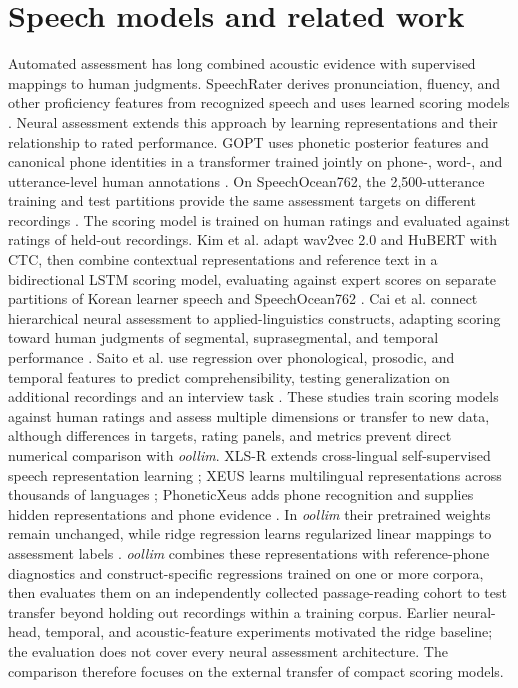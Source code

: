 \documentclass[cameraready]{Interspeech}
\begin{document}
\section{Speech models and related work}
Automated assessment has long combined acoustic evidence with supervised mappings to human judgments. SpeechRater derives pronunciation, fluency, and other proficiency features from recognized speech and uses learned scoring models \cite{speechrater}. Neural assessment extends this approach by learning representations and their relationship to rated performance. GOPT uses phonetic posterior features and canonical phone identities in a transformer trained jointly on phone-, word-, and utterance-level human annotations \cite{gopt}. On SpeechOcean762, the 2,500-utterance training and test partitions provide the same assessment targets on different recordings \cite{speechocean,gopt}. The scoring model is trained on human ratings and evaluated against ratings of held-out recordings. Kim et al. adapt wav2vec 2.0 and HuBERT with CTC, then combine contextual representations and reference text in a bidirectional LSTM scoring model, evaluating against expert scores on separate partitions of Korean learner speech and SpeechOcean762 \cite{kim}. Cai et al. connect hierarchical neural assessment to applied-linguistics constructs, adapting scoring toward human judgments of segmental, suprasegmental, and temporal performance \cite{cai}. Saito et al. use regression over phonological, prosodic, and temporal features to predict comprehensibility, testing generalization on additional recordings and an interview task \cite{saito}. These studies train scoring models against human ratings and assess multiple dimensions or transfer to new data, although differences in targets, rating panels, and metrics prevent direct numerical comparison with \textit{oollim}. XLS-R extends cross-lingual self-supervised speech representation learning \cite{xlsr}; XEUS learns multilingual representations across thousands of languages \cite{xeus}; PhoneticXeus adds phone recognition and supplies hidden representations and phone evidence \cite{phonetic}. In \textit{oollim} their pretrained weights remain unchanged, while ridge regression learns regularized linear mappings to assessment labels \cite{ridge}. \textit{oollim} combines these representations with reference-phone diagnostics and construct-specific regressions trained on one or more corpora, then evaluates them on an independently collected passage-reading cohort to test transfer beyond holding out recordings within a training corpus. Earlier neural-head, temporal, and acoustic-feature experiments motivated the ridge baseline; the evaluation does not cover every neural assessment architecture. The comparison therefore focuses on the external transfer of compact scoring models.
\end{document}
